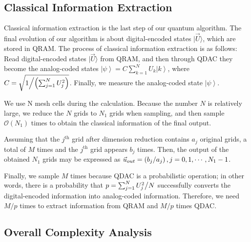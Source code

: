 \documentclass[%
 reprint,
 amsmath,amssymb,
pra,
]{revtex4-1}
\begin{document}
\subsection{Classical Information Extraction}
Classical information extraction is the last step of our quantum algorithm. The final evolution of our algorithm is about digital-encoded states $|\vec{U}\rangle$, which are stored in QRAM. The process of classical information extraction is as follows: Read digital-encoded states $|\vec{U}\rangle$ from QRAM, and then through QDAC they become the analog-coded states $\left| \psi \right\rangle = C\sum\limits_{k = 1}^N {{U_k}\left| k \right\rangle}$, where $C = \sqrt{{1 \mathord{\left/{\vphantom {1 {\left( {\sum\nolimits_{j = 1}^N {U_j^2} } \right)}}} \right. \kern-\nulldelimiterspace}{\left( {\sum\nolimits_{j = 1}^N {U_j^2} } \right)}}}$. Finally, we measure the analog-coded state $\left| \psi \right\rangle $.

We use N mesh cells during the calculation. Because the number $N$ is relatively large, we reduce the $N$ grids to $N_1$ grids when sampling, and then sample $\mathcal{O}(N_1)$ times to obtain the classical information of the final output.

Assuming that the $j^{\text{th}}$ grid after dimension reduction contains $a_j$ original grids, a total of $M$ times and the $j^{\text{th}}$ grid appears $b_j$ times. Then, the output of the obtained $N_1$ grids may be expressed as ${\vec u_{out}} = \left( {{{{b_j}} \mathord{\left/ {\vphantom {{{b_j}} {{a_j}}}} \right. \kern-\nulldelimiterspace} {{a_j}}}} \right),j = 0,1, \cdots ,{N_1} - 1$.

Finally, we sample $M$ times because QDAC is a probabilistic operation; in other words, there is a probability that $p = \sum\nolimits_{j = 1}^N {{{U_j^2} \mathord{\left/{\vphantom {{U_j^2} N}} \right. \kern-\nulldelimiterspace} N}} $ successfully converts the digital-encoded information into analog-coded information. Therefore, we need $M/p$ times to extract information from QRAM and $M/p$ times QDAC.

\subsection{Overall Complexity Analysis}
\end{document}
